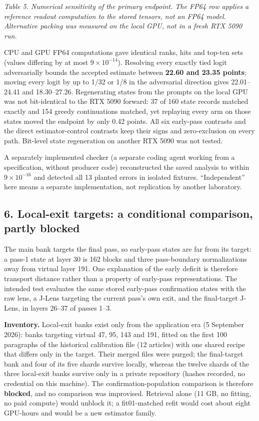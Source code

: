 \documentclass[
  british,
  11pt,
  a4paper,
]{article}
\begin{document}
\emph{Table 5. Numerical sensitivity of the primary endpoint. The FP64
row applies a reference readout computation to the stored tensors, not
an FP64 model. Alternative packing was measured on the local GPU, not in
a fresh RTX 5090 run.}

CPU and GPU FP64 computations gave identical ranks, hits and top-ten
sets (values differing by at most \(9\times10^{-14}\)). Resolving every
exactly tied logit adversarially bounds the accepted estimate between
\textbf{22.60 and 23.35 points}; moving every logit by up to 1/32 or 1/8
in the adversarial direction gives 22.01--24.41 and 18.30--27.26.
Regenerating states from the prompts on the local GPU was not
bit-identical to the RTX 5090 forward: 37 of 160 state records matched
exactly and 154 greedy continuations matched, yet replaying every arm on
those states moved the endpoint by only 0.42 points. All six early-pass
contrasts and the direct estimator-control contrasts keep their signs
and zero-exclusion on every path. Bit-level state regeneration on
another RTX 5090 was not tested.

A separately implemented checker (a separate coding agent working from a
specification, without producer code) reconstructed the saved analysis
to within \(9\times10^{-16}\) and detected all 13 planted errors in
isolated fixtures. ``Independent'' here means a separate implementation,
not replication by another laboratory.

\subsection{6. Local-exit targets: a conditional comparison, partly
blocked}\label{local-exit-targets-a-conditional-comparison-partly-blocked}

The main bank targets the final pass, so early-pass states are far from
its target: a pass-1 state at layer 30 is 162 blocks and three
pass-boundary normalizations away from virtual layer 191. One
explanation of the early deficit is therefore transport distance rather
than a property of early-pass representations. The intended test
evaluates the same stored early-pass confirmation states with the raw
lens, a J-Lens targeting the current pass's own exit, and the
final-target J-Lens, in layers 26--37 of passes 1--3.

\textbf{Inventory.} Local-exit banks exist only from the application era
(5 September 2026): banks targeting virtual 47, 95, 143 and 191, fitted
on the first 100 paragraphs of the historical calibration file (12
articles) with one shared recipe that differs only in the target. Their
merged files were purged; the final-target bank and four of its five
shards survive locally, whereas the twelve shards of the three
local-exit banks survive only in a private repository (hashes recorded,
no credential on this machine). The confirmation-population comparison
is therefore \textbf{blocked}, and no comparison was improvised.
Retrieval alone (11 GB, no fitting, no paid compute) would unblock it; a
fit01-matched refit would cost about eight GPU-hours and would be a new
estimator family.
\end{document}

